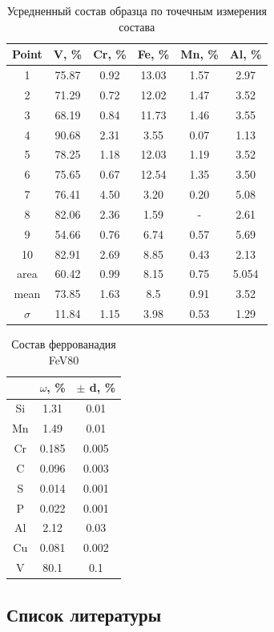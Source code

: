 \documentclass[14pt]{extarticle}
\begin{document}
\begin{table}[H]
	\centering
	\begin{tabular}{|c|c|c|c|c|c|}
		\hline
		Point & V, \% & Cr, \% & Fe, \% & Mn, \% & Al, \% \\
		\hline
		1 & 75.87 & 0.92 & 13.03 & 1.57 & 2.97 \\
		2 & 71.29 & 0.72 & 12.02 & 1.47 & 3.52 \\
		3 & 68.19 & 0.84 & 11.73 & 1.46 & 3.55 \\
		4 & 90.68 & 2.31 & 3.55 & 0.07 & 1.13 \\
		5 & 78.25 & 1.18 & 12.03 & 1.19 & 3.52 \\
		6 & 75.65 & 0.67 & 12.54 & 1.35 & 3.50 \\
		7 & 76.41 & 4.50 & 3.20 & 0.20 & 5.08 \\
		8 & 82.06 & 2.36 & 1.59 & - & 2.61 \\
		9 & 54.66 & 0.76 & 6.74 & 0.57 & 5.69 \\
		10 & 82.91 & 2.69 & 8.85 & 0.43 & 2.13 \\
		area & 60.42 & 0.99 & 8.15 & 0.75 & 5.054 \\ \hline
		mean & 73.85 & 1.63 & 8.5 & 0.91 & 3.52 \\ \hline
		$\sigma$ & 11.84 & 1.15 & 3.98 & 0.53 & 1.29 \\ \hline
	\end{tabular}
	\caption{Усредненный состав образца по точечным измерения состава} 
\end{table}

\begin{table}[H]
	\centering
	\begin{tabular}{|c|c|c|}
	\hline
	 & $\omega$, \% & $\pm$ d, \% \\
	\hline
		Si & 1.31 & 0.01 \\
		Mn & 1.49 & 0.01 \\
		Cr & 0.185 & 0.005 \\
		C & 0.096 & 0.003 \\
		S & 0.014 & 0.001 \\
		P & 0.022 & 0.001 \\
		Al & 2.12 & 0.03 \\
		Cu & 0.081 & 0.002 \\
		V & 80.1 & 0.1 \\
	\hline
	\end{tabular}
	\caption{Состав феррованадия FeV80}
\end{table}

\subsection*{Список литературы}
\end{document}
